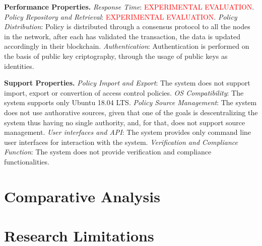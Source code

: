 \textbf{Performance Properties.} \emph{Response Time}: \textcolor{red}{EXPERIMENTAL EVALUATION}. \emph{Policy Repository and Retrieval}: \textcolor{red}{EXPERIMENTAL EVALUATION}. \emph{Policy Distribution}: Policy is distributed through a consensus protocol to all the nodes in the network, after each has validated the transaction, the data is updated accordingly in their blockchain. \emph{Authentication}: Authentication is performed on the basis of public key criptography, through the usage of public keys as identities.

\textbf{Support Properties.} \emph{Policy Import and Export}: The system does not support import, export or convertion of access control policies. \emph{OS Compatibility}: The system supports only Ubuntu 18.04 LTS. \emph{Policy Source Management}: The system does not use authorative sources, given that one of the goals is descentralizing the system thus having no single authority, and, for that, does not support source management. \emph{User interfaces and API}: The system provides only command line user interfaces for interaction with the system. \emph{Verification and Compliance Function}: The system does not provide verification and compliance functionalities.

\section{Comparative Analysis}

\section{Research Limitations}
